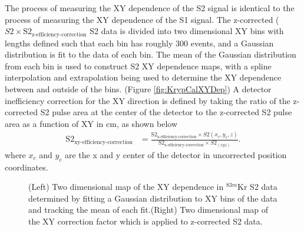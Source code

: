 \documentclass[a4paper,12pt]{article}
\begin{document}
{The process of measuring the XY dependence of the S2 signal is identical to the process of measuring the XY dependence of the S1 signal.  The z-corrected ($S2 \times \mbox{S}2_{\mbox{z-efficiency-correction}}$ S2 data is divided into two dimensional XY bins with lengths defined such that each bin has roughly 300 events, and a Gaussian distribution is fit to the data of each bin.  The mean of the Gaussian distribution from each bin is used to construct S2 XY dependence maps, with a spline interpolation and extrapolation being used to determine the XY dependence between and outside of the bins. (Figure \ref{fig:KrypCalXYDep}) A detector inefficiency correction for the XY direction is defined by taking the ratio of the z-corrected S2 pulse area at the center of the detector to the z-corrected S2 pulse area as a function of XY in cm, as shown below
\begin{align}
\mbox{S}2_{\mbox{xy-efficiency-correction}} &= \frac{\mbox{S}2_{\mbox{z-efficiency-correction}}\times S2(x_c,y_c,z)}{\mbox{S}2_{\mbox{z-efficiency-correction}}\times S2_(xyz)}.
\end{align} 
where $x_c$ and $y_c$ are the x and y center of the detector in uncorrected position coordinates.

\begin{figure} 
\centering
{}
\qquad
{}
\caption{ (Left) Two dimensional map of the XY dependence in $^{83m}$Kr S2 data determined by fitting a Gaussian distribution to XY bins of the data and tracking the mean of each fit.(Right) Two dimensional map of the XY correction factor which is applied to z-corrected S2 data.}
\label{fig:KrypCalS2XYDep}
\end{figure}

}
\end{document}
